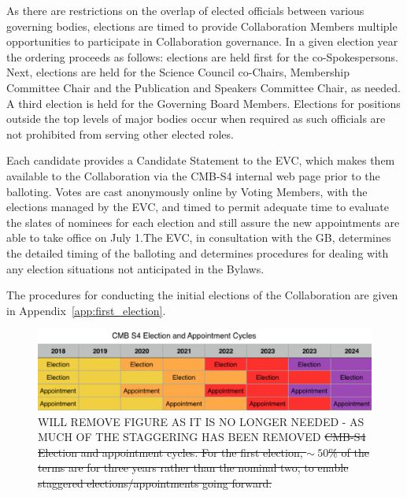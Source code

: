 \documentclass[12pt]{article}
\begin{document}
As there are restrictions on the overlap of elected officials between various governing bodies, elections are timed to provide Collaboration Members multiple opportunities to participate in Collaboration governance. 
In a given election year the ordering proceeds as follows: elections are held first for the co-Spokespersons. Next, elections are held for the Science Council co-Chairs, Membership Committee Chair and the Publication and Speakers Committee Chair, as needed.  A third election is held for the Governing Board Members. 
Elections for positions outside the top levels of major bodies occur when required as such officials are not prohibited from serving other elected roles. 

Each candidate provides a Candidate Statement to the EVC, which makes them available to the Collaboration via the CMB-S4 internal web page prior to the balloting.   Votes are cast anonymously online by Voting Members, with the elections managed by the EVC, and timed to permit adequate time to evaluate the slates of nominees for each election and still assure the new appointments are able to take office on July 1.The EVC, in consultation with the GB,  determines the detailed timing of the balloting and determines procedures for dealing with any election situations not anticipated in the Bylaws.

The procedures for conducting the initial elections of the Collaboration are given in Appendix~\ref{app:first_election}.



\begin{figure}[h!]
\begin{center}
\includegraphics[width=6.5in]{Election_cycle_v2.png}
\end{center}
\caption{\color{red} WILL REMOVE FIGURE AS IT IS NO LONGER NEEDED - AS MUCH OF THE STAGGERING HAS BEEN REMOVED \sout{CMB-S4 Election and appointment cycles. For the first election, $\sim\ 50$\% of the terms are for three years rather than the nominal two, to enable staggered elections/appointments going forward.}}
\label{fig:elect_cycle}
\end{figure}
\end{document}
